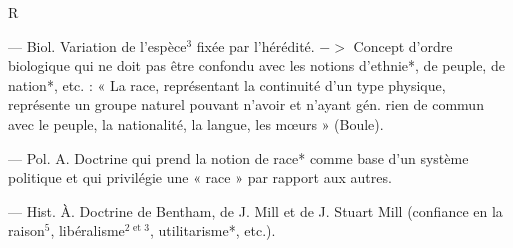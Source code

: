 \begin{itemize}[leftmargin=1cm, label=, itemsep=1pt]
\begin{center}
R
\end{center}

 — Biol. Variation de l’espèce$^3$
fixée par l’hérédité. $->$ Concept
d'ordre biologique qui ne doit pas
être confondu avec les notions
d’ethnie*, de peuple, de nation*, etc. :
« La race, représentant la continuité
d'un type physique, représente un
groupe naturel pouvant n’avoir et
n'ayant gén. rien de commun avec
le peuple, la nationalité, la langue,
les mœurs » (Boule).

 — Pol. A. Doctrine qui
prend la notion de race* comme base
d’un système politique et qui privilégie une « race » par rapport aux
autres.

 — Hist.
À. Doctrine de Bentham, de J. Mill
et de J. Stuart Mill (confiance en
la raison$^5$, libéralisme$^\text{2 et 3}$, utilitarisme*, etc.).


\end{itemize}
